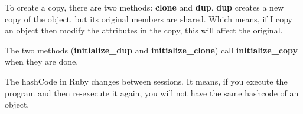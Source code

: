\documentclass{KodeBook}
\begin{document}
To create a copy, there are two methods: \textbf{clone} and \textbf{dup}. 
\textbf{dup} creates a new copy of the object, but its original members are shared. 
Which means, if I copy an object then modify the attributes in the copy, this will affect the original.



The two methods (\textbf{initialize\_dup} and \textbf{initialize\_clone}) call \textbf{initialize\_copy} when they are done.


The hashCode in Ruby changes between sessions.
It means, if you execute the program and then re-execute it again, you will not have the same hashcode of an object.

\ifx\wholebook\relax\else
% 
% 
	
\end{document}

